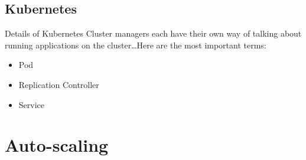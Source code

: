 \documentclass{beamer}
\begin{document}
\subsection{Kubernetes}

\begin{frame}{Details of Kubernetes}
  Cluster managers each have their own way of talking about running applications
  on the cluster\ldots Here are the most important terms:


  \begin{itemize}
    \item Pod
    \item Replication Controller
    \item Service
  \end{itemize}
\end{frame}

\section{Auto-scaling}

\end{document}

